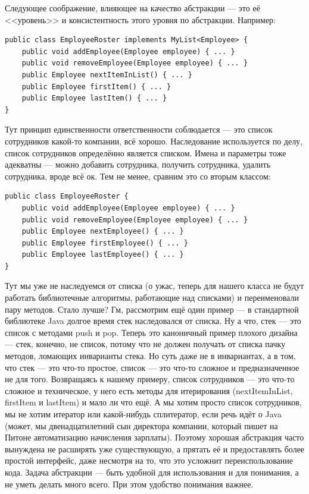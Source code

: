 \documentclass{../text-style}
\begin{document}
Следующее соображение, влияющее на качество абстракции --- это её <<уровень>> и консистентность этого уровня по абстракции. Например:

\begin{verbatim}
public class EmployeeRoster implements MyList<Employee> {
    public void addEmployee(Employee employee) { ... }
    public void removeEmployee(Employee employee) { ... }
    public Employee nextItemInList() { ... }
    public Employee firstItem() { ... }
    public Employee lastItem() { ... }
}
\end{verbatim}

Тут принцип единственности ответственности соблюдается --- это список сотрудников какой-то компании, всё хорошо. Наследование используется по делу, список сотрудников определённо является списком. Имена и параметры тоже адекватны --- можно добавить сотрудника, получить сотрудника, удалить сотрудника, вроде всё ок. Тем не менее, сравним это со вторым классом:

\begin{verbatim}
public class EmployeeRoster {
    public void addEmployee(Employee employee) { ... }
    public void removeEmployee(Employee employee) { ... }
    public Employee nextEmployee() { ... }
    public Employee firstEmployee() { ... }
    public Employee lastEmployee() { ... }
}
\end{verbatim}

Тут мы уже не наследуемся от списка (о ужас, теперь для нашего класса не будут работать библиотечные алгоритмы, работающие над списками) и переименовали пару методов. Стало лучше? Гм, рассмотрим ещё один пример --- в стандартной библиотеке Java долгое время стек наследовался от списка. Ну а что, стек --- это список с методами push и pop. Теперь это каноничный пример плохого дизайна --- стек, конечно, не список, потому что не должен получать от списка пачку методов, ломающих инварианты стека. Но суть даже не в инвариантах, а в том, что стек --- это что-то простое, список --- это что-то сложное и предназначенное не для того. Возвращаясь к нашему примеру, список сотрудников --- это что-то сложное и техническое, у него есть методы для итерирования (nextItemInList, firstItem и lastItem) и мало ли что ещё. А мы хотим просто список сотрудников, мы не хотим итератор или какой-нибудь сплитератор, если речь идёт о Java (может, мы двенадцатилетний сын директора компании, который пишет на Питоне автоматизацию начисления зарплаты). Поэтому хорошая абстракция часто вынуждена не расширять уже существующую, а прятать её и предоставлять более простой интерфейс, даже несмотря на то, что это усложнит переиспользование кода. Задача абстракции --- быть удобной для использования и для понимания, а не уметь делать много всего. При этом удобство понимания важнее.
\end{document}
